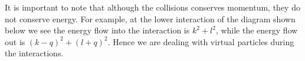 \begin{imp}
It is important to note that although the collisions conserves momentum, they do not conserve energy. For example, at the lower interaction of the diagram shown below we see the energy flow into the interaction  is $k^2+l^2$, while the energy flow out is $(k-q)^2+(l+q)^2$. Hence we are dealing with virtual particles during the interactions.
\begin{center}
    



\begin{tikzpicture}[x=0.75pt,y=0.75pt,yscale=-1,xscale=1]


\end{tikzpicture}
\end{center}
\end{imp}
